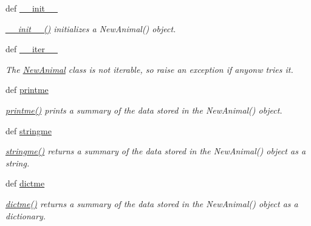 \begin{DoxyCompactItemize}
\item 
def \hyperlink{classPyPedal_1_1pyp__newclasses_1_1NewAnimal_ab0d4dd46ff0e2683c670c36a270aba48}{\_\-\_\-init\_\-\_\-}
\begin{DoxyCompactList}\small\item\em \hyperlink{classPyPedal_1_1pyp__newclasses_1_1NewAnimal_ab0d4dd46ff0e2683c670c36a270aba48}{\_\-\_\-init\_\-\_\-()} initializes a NewAnimal() object. \end{DoxyCompactList}\item 
def \hyperlink{classPyPedal_1_1pyp__newclasses_1_1NewAnimal_a1fcb3af402b8a9a0f8779d8c466300c2}{\_\-\_\-iter\_\-\_\-}
\begin{DoxyCompactList}\small\item\em The \hyperlink{classPyPedal_1_1pyp__newclasses_1_1NewAnimal}{NewAnimal} class is not iterable, so raise an exception if anyonw tries it. \end{DoxyCompactList}\item 
def \hyperlink{classPyPedal_1_1pyp__newclasses_1_1NewAnimal_aa3dbef8ded04c8e33c2d4f45fb98773a}{printme}
\begin{DoxyCompactList}\small\item\em \hyperlink{classPyPedal_1_1pyp__newclasses_1_1NewAnimal_aa3dbef8ded04c8e33c2d4f45fb98773a}{printme()} prints a summary of the data stored in the NewAnimal() object. \end{DoxyCompactList}\item 
def \hyperlink{classPyPedal_1_1pyp__newclasses_1_1NewAnimal_ab2618a6a1bf2fac243a19799e60b5195}{stringme}
\begin{DoxyCompactList}\small\item\em \hyperlink{classPyPedal_1_1pyp__newclasses_1_1NewAnimal_ab2618a6a1bf2fac243a19799e60b5195}{stringme()} returns a summary of the data stored in the NewAnimal() object as a string. \end{DoxyCompactList}\item 
def \hyperlink{classPyPedal_1_1pyp__newclasses_1_1NewAnimal_af44ae249e4d1bada4a80357328f2b66d}{dictme}
\begin{DoxyCompactList}\small\item\em \hyperlink{classPyPedal_1_1pyp__newclasses_1_1NewAnimal_af44ae249e4d1bada4a80357328f2b66d}{dictme()} returns a summary of the data stored in the NewAnimal() object as a dictionary. \end{DoxyCompactList}\item 

\end{DoxyCompactItemize}
